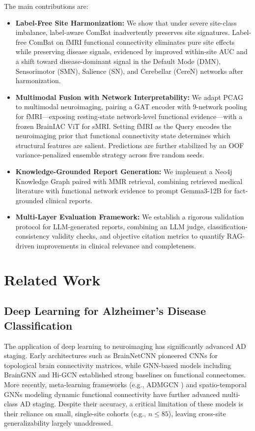 \documentclass[conference]{IEEEtran}
\begin{document}
The main contributions are:
\begin{itemize}
    \item \textbf{Label-Free Site Harmonization:} We show that under severe site-class imbalance, label-aware ComBat inadvertently preserves site signatures. Label-free ComBat on fMRI functional connectivity eliminates pure site effects while preserving disease signals, evidenced by improved within-site AUC and a shift toward disease-dominant signal in the Default Mode (DMN), Sensorimotor (SMN), Salience (SN), and Cerebellar (CereN) networks after harmonization.
    \item \textbf{Multimodal Fusion with Network Interpretability:} We adapt PCAG \cite{zhang2024pcag} to multimodal neuroimaging, pairing a GAT encoder with 9-network pooling for fMRI---exposing resting-state network-level functional evidence---with a frozen BrainIAC ViT for sMRI. Setting fMRI as the Query encodes the neuroimaging prior that functional connectivity state determines which structural features are salient. Predictions are further stabilized by an OOF variance-penalized ensemble strategy across five random seeds.
    \item \textbf{Knowledge-Grounded Report Generation:} We implement a Neo4j Knowledge Graph paired with MMR retrieval, combining retrieved medical literature with functional network evidence to prompt Gemma3-12B for fact-grounded clinical reports.
    \item \textbf{Multi-Layer Evaluation Framework:} We establish a rigorous validation protocol for LLM-generated reports, combining an LLM judge, classification-consistency validity checks, and objective citation metrics to quantify RAG-driven improvements in clinical relevance and completeness.
\end{itemize}

\section{Related Work}

\subsection{Deep Learning for Alzheimer's Disease Classification}
The application of deep learning to neuroimaging has significantly advanced AD staging. Early architectures such as BrainNetCNN \cite{kawahara2017brainnetcnn} pioneered CNNs for topological brain connectivity matrices, while GNN-based models including BrainGNN \cite{li2021braingnn} and Hi-GCN \cite{jiang2020higcn} established strong baselines on functional connectomes. More recently, meta-learning frameworks (e.g., ADMGCN \cite{sun2025admgcn}) and spatio-temporal GNNs modeling dynamic functional connectivity \cite{wen2025stdfbn} have further advanced multi-class AD staging. Despite their accuracy, a critical limitation of these models is their reliance on small, single-site cohorts (e.g., $n \leq 85$), leaving cross-site generalizability largely unaddressed.
\end{document}
